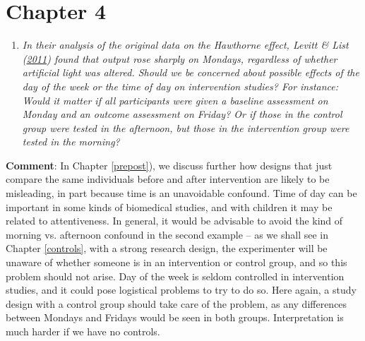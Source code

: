 \documentclass{krantz}
\providecommand{\tightlist}{%
\setlength{\itemsep}{0pt}\setlength{\parskip}{0pt}}
\begin{document}
\hypertarget{chapter-4}{%
\section{Chapter 4}\label{chapter-4}}

\begin{enumerate}
\def\labelenumi{\arabic{enumi}.}
\tightlist
\item
  \emph{In their analysis of the original data on the Hawthorne effect, Levitt \& List (\protect\hyperlink{ref-levitt2011}{2011}) found that output rose sharply on Mondays, regardless of whether artificial light was altered. Should we be concerned about possible effects of the day of the week or the time of day on intervention studies? For instance: Would it matter if all participants were given a baseline assessment on Monday and an outcome assessment on Friday? Or if those in the control group were tested in the afternoon, but those in the intervention group were tested in the morning?}
\end{enumerate}

\textbf{Comment}: In Chapter \ref{prepost}), we discuss further how designs that just compare the same individuals before and after intervention are likely to be misleading, in part because time is an unavoidable confound. Time of day can be important in some kinds of biomedical studies, and with children it may be related to attentiveness. In general, it would be advisable to avoid the kind of morning vs. afternoon confound in the second example -- as we shall see in Chapter \ref{controls}, with a strong research design, the experimenter will be unaware of whether someone is in an intervention or control group, and so this problem should not arise. Day of the week is seldom controlled in intervention studies, and it could pose logistical problems to try to do so. Here again, a study design with a control group should take care of the problem, as any differences between Mondays and Fridays would be seen in both groups. Interpretation is much harder if we have no controls.
\end{document}
